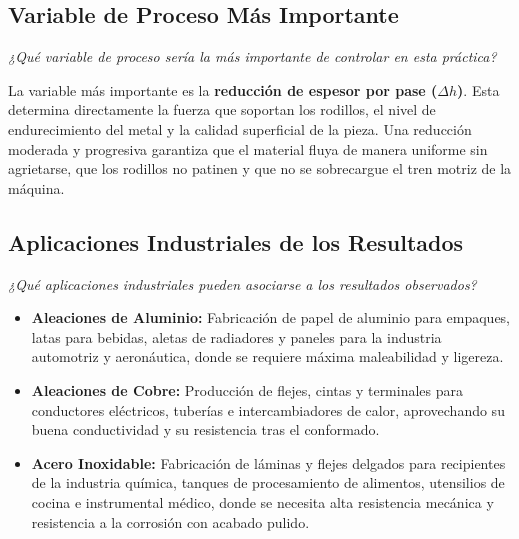 \documentclass[journal]{IEEEtran}
\begin{document}
\subsection{Variable de Proceso Más Importante}
\textit{¿Qué variable de proceso sería la más importante de controlar en esta práctica?}

La variable más importante es la \textbf{reducción de espesor por pase ($\Delta h$)}. Esta determina directamente la fuerza que soportan los rodillos, el nivel de endurecimiento del metal y la calidad superficial de la pieza. Una reducción moderada y progresiva garantiza que el material fluya de manera uniforme sin agrietarse, que los rodillos no patinen y que no se sobrecargue el tren motriz de la máquina.

\subsection{Aplicaciones Industriales de los Resultados}
\textit{¿Qué aplicaciones industriales pueden asociarse a los resultados observados?}
\begin{itemize}
    \item \textbf{Aleaciones de Aluminio:} Fabricación de papel de aluminio para empaques, latas para bebidas, aletas de radiadores y paneles para la industria automotriz y aeronáutica, donde se requiere máxima maleabilidad y ligereza.
    \item \textbf{Aleaciones de Cobre:} Producción de flejes, cintas y terminales para conductores eléctricos, tuberías e intercambiadores de calor, aprovechando su buena conductividad y su resistencia tras el conformado.
    \item \textbf{Acero Inoxidable:} Fabricación de láminas y flejes delgados para recipientes de la industria química, tanques de procesamiento de alimentos, utensilios de cocina e instrumental médico, donde se necesita alta resistencia mecánica y resistencia a la corrosión con acabado pulido.
\end{itemize}
\end{document}
